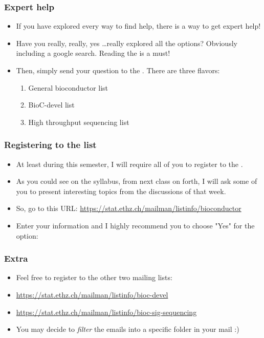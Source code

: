 \begin{frame}[allowframebreaks]
  \frametitle{Expert help}
  \begin{itemize}
  \item If you have explored every way to find help, there is a way to get expert help!
  \item Have you really, really, yes \ldots really explored \alert{all} the options? Obviously including a google search. Reading the  is a must!
  \item Then, simply send your question to the . There are three flavors:
  \begin{enumerate}
  \item General bioconductor list
  \item BioC-devel list
  \item High throughput sequencing list
  \end{enumerate}
  \end{itemize}
\end{frame}

\begin{frame}[allowframebreaks]
  \frametitle{Registering to the list}
  \begin{itemize}
  \item At least during this semester, I will require \alert{all of you} to register to the .
  \item As you could see on the syllabus, from next class on forth, I will ask some of you to present interesting topics from the discussions of that week.
  \item So, go to this URL: \url{https://stat.ethz.ch/mailman/listinfo/bioconductor} 
  \item Enter your information and I \alert{highly} recommend you to choose "Yes" for the option:  
  \end{itemize}
\end{frame}

\begin{frame}[allowframebreaks]
  \frametitle{Extra}
  \begin{itemize}
  \item Feel free to register to the other two mailing lists: 
  \item \url{https://stat.ethz.ch/mailman/listinfo/bioc-devel}
  \item \url{https://stat.ethz.ch/mailman/listinfo/bioc-sig-sequencing}
  \item You may decide to \emph{filter} the emails into a specific folder in your mail :) 
  \end{itemize}
\end{frame}

